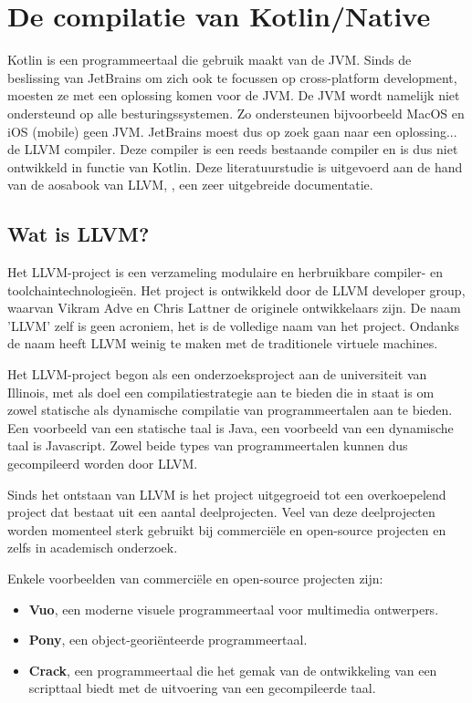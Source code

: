 
\chapter{De compilatie van Kotlin/Native}
\label{ch:compiler}
Kotlin is een programmeertaal die gebruik maakt van de JVM. Sinds de beslissing van JetBrains om zich ook te focussen op cross-platform development, moesten ze met een oplossing komen voor de JVM. De JVM wordt namelijk niet ondersteund op alle besturingssystemen. Zo ondersteunen bijvoorbeeld MacOS en iOS (mobile) geen JVM. JetBrains moest dus op zoek gaan naar een oplossing... de LLVM compiler. Deze compiler is een reeds bestaande compiler en is dus niet ontwikkeld in functie van Kotlin. Deze literatuurstudie is uitgevoerd aan de hand van de aosabook van LLVM, \textcite{aosa}, een zeer uitgebreide documentatie. 

\section{Wat is LLVM?}
Het LLVM-project is een verzameling modulaire en herbruikbare compiler- en toolchaintechnologieën. Het project is ontwikkeld door de LLVM developer group, waarvan Vikram Adve en Chris Lattner de originele ontwikkelaars zijn. De naam 'LLVM' zelf is geen acroniem, het is de volledige naam van het project. Ondanks de naam heeft LLVM weinig te maken met de traditionele virtuele machines.

Het LLVM-project begon als een onderzoeksproject aan de universiteit van Illinois, met als doel een compilatiestrategie aan te bieden die in staat is om zowel statische als dynamische compilatie van programmeertalen aan te bieden. Een voorbeeld van een statische taal is Java, een voorbeeld van een dynamische taal is Javascript. Zowel beide types van programmeertalen kunnen dus gecompileerd worden door LLVM.

Sinds het ontstaan van LLVM is het project uitgegroeid tot een overkoepelend project dat bestaat uit een aantal deelprojecten. Veel van deze deelprojecten worden momenteel sterk gebruikt bij commerciële en open-source projecten en zelfs in academisch onderzoek.

Enkele voorbeelden van commerciële en open-source projecten zijn:
\begin{itemize}
	\item \textbf{Vuo}, een moderne visuele programmeertaal voor multimedia ontwerpers.
	\item \textbf{Pony}, een object-georiënteerde programmeertaal.
	\item \textbf{Crack}, een programmeertaal die het gemak van de ontwikkeling van een scripttaal biedt met de uitvoering van een gecompileerde taal.
\end{itemize}

